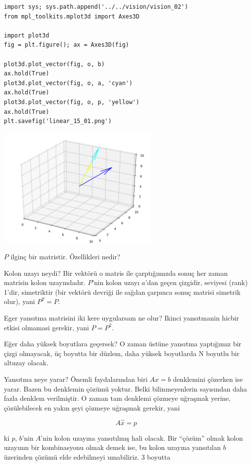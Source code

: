 \documentclass[12pt,fleqn]{article}\usepackage{../../common}
\begin{document}
\begin{verbatim}
import sys; sys.path.append('../../vision/vision_02')
from mpl_toolkits.mplot3d import Axes3D

import plot3d
fig = plt.figure(); ax = Axes3D(fig)

plot3d.plot_vector(fig, o, b)
ax.hold(True)
plot3d.plot_vector(fig, o, a, 'cyan')
ax.hold(True)
plot3d.plot_vector(fig, o, p, 'yellow')
ax.hold(True)
plt.savefig('linear_15_01.png')
\end{verbatim}

\includegraphics[height=6cm]{linear_15_01.png}

$P$ ilginç bir matristir. Özellikleri nedir?

Kolon uzayı neydi? Bir vektörü o matris ile çarptığımızda sonuç her zaman
matrisin kolon uzayındadır. $P$'nin kolon uzayı $a$'dan geçen çizgidir,
seviyesi (rank) 1'dir, simetriktir (bir vektörü devriği ile sağdan çarpınca
sonuç matrisi simetrik olur), yani $P^T = P$. 

Eger yansıtma matrisini iki kere uygularsam ne olur? Ikinci yansıtmanin
hicbir etkisi olmamasi gerekir, yani $P = P^2$. 

Eğer daha yüksek boyutlara geçersek? O zaman üstüne yansıtma yaptığımız bir
çizgi olmayacak, üç boyutta bir düzlem, daha yüksek boyutlarda N boyutlu
bir altuzay olacak.

Yansıtma neye yarar? Önemli faydalarından biri $Ax = b$ denklemini çözerken
ise yarar. Bazen bu denklemin çözümü yoktur. Belki bilinmeyenlerin sayısından
daha fazla denklem verilmiştir. O zaman tam denklemi çözmeye uğraşmak
yerine, çözülebilecek en yakın şeyi çözmeye uğraşmak gerekir, yani 

$$ A\hat{x} = p $$

ki $p$, $b$'nin $A$'nin kolon uzayına yansıtılmış hali olacak. Bir
``çözüm'' olmak kolon uzayının bir kombinasyonu olmak demek ise, bu kolon
uzayına yansıtılan $b$ üzerinden çözümü elde edebilmeyi umabiliriz. 3
boyutta
\end{document}
